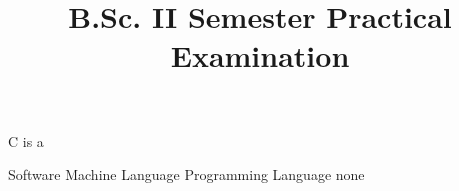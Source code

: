 \documentclass{exam}
\begin{document}
\begin{center}
\title{B.Sc. II Semester Practical Examination}
\end{center}
\maketitle
\begin{questions}

\question C is a 

\begin{oneparchoices}
	\choice	Software
	\choice Machine Language
	\choice Programming Language 
	\choice none  
\end{oneparchoices}


\end{questions}
\end{document}
